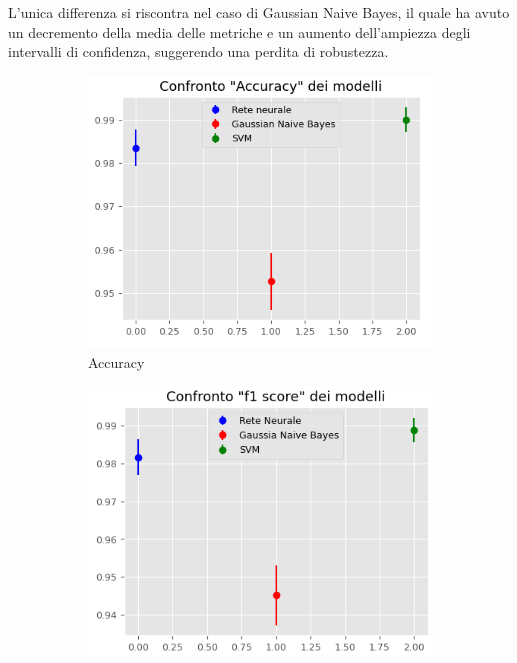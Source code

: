 L'unica differenza si riscontra nel caso di Gaussian Naive Bayes, il quale ha
avuto un decremento della media delle metriche e un aumento dell'ampiezza degli
intervalli di confidenza, suggerendo una perdita di robustezza.
\begin{figure}[!ht]
    \centering
    \begin{subfigure}[b]{0.4\textwidth}
        \centering
        \includegraphics[width=\textwidth]{img/ris/accuracy_inter_pca.png}
        \caption{Accuracy}
        \label{fig:acc_pca}
    \end{subfigure}
    \hfill
    \begin{subfigure}[b]{0.4\textwidth}
        \centering
        \includegraphics[width=\textwidth]{img/ris/fscore_inter_pca.png}

\end{subfigure}
\end{figure}
